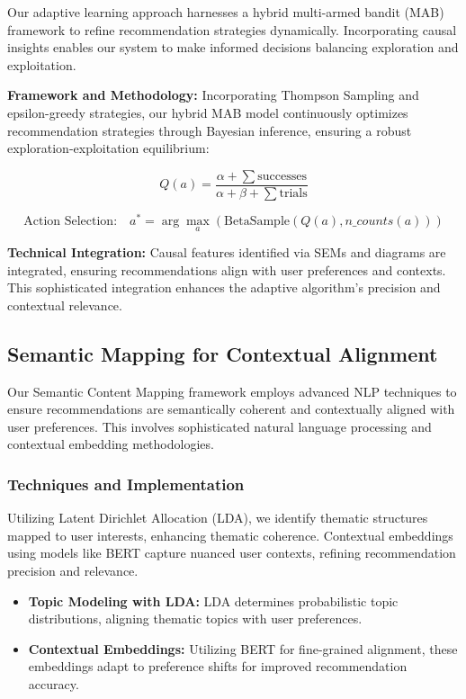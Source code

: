 Our adaptive learning approach harnesses a hybrid multi-armed bandit (MAB) framework to refine recommendation strategies dynamically. Incorporating causal insights enables our system to make informed decisions balancing exploration and exploitation.

\textbf{Framework and Methodology:} Incorporating Thompson Sampling and epsilon-greedy strategies, our hybrid MAB model continuously optimizes recommendation strategies through Bayesian inference, ensuring a robust exploration-exploitation equilibrium:

\begin{equation}
Q(a) = \frac{\alpha + \sum \text{successes}}{\alpha + \beta + \sum \text{trials}}
\end{equation}

\begin{equation}
\text{Action Selection:} \quad a^* = \arg\max_{a}\left(\text{BetaSample}(Q(a), n\_counts(a))\right)
\end{equation}

\textbf{Technical Integration:} Causal features identified via SEMs and diagrams are integrated, ensuring recommendations align with user preferences and contexts. This sophisticated integration enhances the adaptive algorithm's precision and contextual relevance.

\subsection{Semantic Mapping for Contextual Alignment}

Our Semantic Content Mapping framework employs advanced NLP techniques to ensure recommendations are semantically coherent and contextually aligned with user preferences. This involves sophisticated natural language processing and contextual embedding methodologies.

\subsubsection{Techniques and Implementation}

Utilizing Latent Dirichlet Allocation (LDA), we identify thematic structures mapped to user interests, enhancing thematic coherence. Contextual embeddings using models like BERT capture nuanced user contexts, refining recommendation precision and relevance.

\begin{itemize}
    \item \textbf{Topic Modeling with LDA:} LDA determines probabilistic topic distributions, aligning thematic topics with user preferences.
    \item \textbf{Contextual Embeddings:} Utilizing BERT for fine-grained alignment, these embeddings adapt to preference shifts for improved recommendation accuracy.
\end{itemize}

